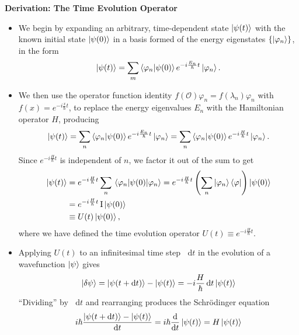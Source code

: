 \documentclass[11pt, a4paper]{article}
\newcommand{\diff}{\mathop{}\!\mathrm{d}} %
\newcommand{\Schro}{Schr\"{o}dinger\xspace}
\newcommand{\Ham}{Hamiltonian\xspace}
\renewcommand{\O}{\mathcal{O}}  %
\newcommand{\II}{\operatorname{I}}  %
\newcommand{\p}{\psi}  %
\begin{document}
\textbf{Derivation: The Time Evolution Operator}
\begin{itemize}
    \item We begin by expanding an arbitrary, time-dependent state $ \ket{\psi(t)} $ with the known initial state $ \ket{\psi(0)} $ in a basis formed of the energy eigenstates $ \{\ket{\varphi_{n}}\} $, in the form
	\begin{equation*}
		\ket{\p(t)} = \sum_{m}\braket{\varphi_{n}}{\p(0)}e^{-i\frac{E_{n}}{\hbar}t}\ket{\varphi_{n}}.
	\end{equation*}
    
    \item We then use the operator function identity $ f(\O)\varphi_{n} = f(\lambda_{n} )\varphi_{n} $ with $ f(x) = e^{-i \frac{x}{\hbar} t} $, to replace the energy eigenvalues $ E_{n} $ with the \Ham operator $ H $, producing
	\begin{equation*}
		\ket{\p(t)} = \sum_{n}\braket{\varphi_{n}}{\p(0)} e^{-i\frac{E_{n}}{\hbar}t}\ket{\varphi_{n}} = \sum_{n} \braket{\varphi_{n}}{\p(0)} e^{-i\frac{H}{\hbar}t}\ket{\varphi_{n}}.
	\end{equation*}
	Since $ e^{-i\frac{H}{\hbar}t} $ is independent of $ n $, we factor it out of the sum to get
	\begin{align*}
        \ket{\p(t)} &= e^{-i\frac{H}{\hbar}t} \sum_{n} \mel{\varphi_{n}}{\p(0)}{\varphi_{n}} = e^{-i \frac{H}{\hbar}t} \left( \sum_{n} \ket{\varphi_{n}}\bra{\varphi} \right) \ket{\psi(0)} \\
        & = e^{-i \frac{H}{\hbar}t} \II \ket{\psi(0)}\\
        & \equiv U(t) \ket{\p(0)},
	\end{align*}
	where we have defined the time evolution operator $ U(t) \equiv e^{-i\frac{H}{\hbar}t} $. 
	
	\item Applying $ U(t) $ to an infinitesimal time step $ \diff t $ in the evolution of a wavefunction $ \ket{\p} $ gives
	\begin{equation*}
		\ket{\delta \p} = \ket{\psi(t + \diff t)} - \ket{\p(t)} = -i\frac{H}{\hbar}\diff t \ket{\p(t)}
	\end{equation*}
	``Dividing'' by $ \diff t $ and rearranging produces the \Schro equation
	\begin{equation*}
		i \hbar \frac{\ket{\psi(t + \diff t)} - \ket{\p(t)}}{\diff t} = i \hbar \dv{t}\ket{\psi(t)} = H \ket{\psi(t)}
	\end{equation*}
\end{itemize}
\end{document}
